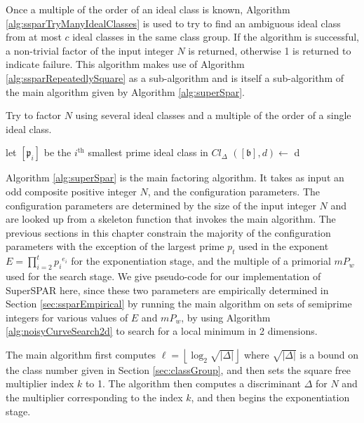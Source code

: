 \documentclass{ucalgthes1}
\theoremstyle{definition}
\newcommand{\floor}[1]{\left\lfloor #1 \right\rfloor}
\newcommand{\ideal}{\mathfrak}
\newcommand{\idealclass}[1]{\left[ \ideal #1 \right]}
\newcommand{\bclass}{\idealclass b}
\newcommand{\hdelta}{\sqrt{|\Delta|}}
\begin{document}
Once a multiple of the order of an ideal class is known, Algorithm \ref{alg:ssparTryManyIdealClasses} is used to try to find an ambiguous ideal class from at most $c$ ideal classes in the same class group.  If the algorithm is successful, a non-trivial factor of the input integer $N$ is returned, otherwise 1 is returned to indicate failure.  This algorithm makes use of Algorithm \ref{alg:ssparRepeatedlySquare} as a sub-algorithm and is itself a sub-algorithm of the main algorithm given by Algorithm \ref{alg:superSpar}. 

\begin{algorithm}[htb]
\caption[Try Many Ideal Classes.]{Try to factor $N$ using several ideal classes and a multiple of the order of a single ideal class.}
\label{alg:ssparTryManyIdealClasses}
\begin{algorithmic}[1]
	\State let $\idealclass{p_i}$ be the $i^{\textrm{th}}$ smallest prime ideal class in $Cl_\Delta$
	\State $(\bclass, d) \gets$ \Call{RepeatedlySquare}{$\idealclass{p_i}^h$, $\ell$} \Comment{$\bclass$ is ignored}
		\Return d \EndIf
\EndFor
\State {}
\EndProcedure
\end{algorithmic}
\end{algorithm}

Algorithm \ref{alg:superSpar} is the main factoring algorithm.  It takes as input an odd composite positive integer $N$, and the configuration parameters.  The configuration parameters are determined by the size of the input integer $N$ and are looked up from a skeleton function that invokes the main algorithm.  The previous sections in this chapter constrain the majority of the configuration parameters with the exception of the largest prime $p_t$ used in the exponent $E = \prod_{i=2}^t {p_i}^{e_i}$ for the exponentiation stage, and the multiple of a primorial $mP_w$ used for the search stage.  We give pseudo-code for our implementation of SuperSPAR here, since these two parameters are empirically determined in Section \ref{sec:ssparEmpirical} by running the main algorithm on sets of semiprime integers for various values of $E$ and $mP_w$, by using Algorithm \ref{alg:noisyCurveSearch2d} to search for a local minimum in 2 dimensions.

The main algorithm first computes $\ell = \floor{\log_2 \hdelta}$ where $\hdelta$ is a bound on the class number given in Section \ref{sec:classGroup}, and then sets the square free multiplier index $k$ to 1.  The algorithm then computes a discriminant $\Delta$ for $N$ and the multiplier corresponding to the index $k$, and then begins the exponentiation stage.
\end{document}

